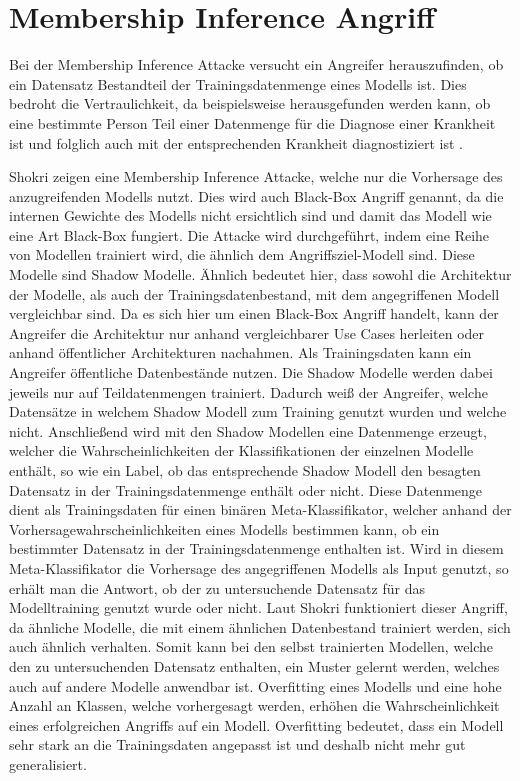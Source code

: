 \section{Membership Inference Angriff}\label{sec:membership_inference}

Bei der Membership Inference Attacke versucht ein Angreifer herauszufinden, ob ein Datensatz Bestandteil der Trainingsdatenmenge eines Modells ist. 
Dies bedroht die Vertraulichkeit, da beispielsweise herausgefunden werden kann, ob eine bestimmte Person Teil einer Datenmenge für die Diagnose einer Krankheit ist und folglich auch mit der entsprechenden Krankheit diagnostiziert ist \cite{P-2}.

Shokri \etal \cite{P-2} zeigen eine Membership Inference Attacke, welche nur die Vorhersage des anzugreifenden Modells nutzt. 
Dies wird auch Black-Box Angriff genannt, da die internen Gewichte des Modells nicht ersichtlich sind und damit das Modell wie eine Art Black-Box fungiert.
Die Attacke wird durchgeführt, indem eine Reihe von Modellen trainiert wird, die ähnlich dem Angriffsziel-Modell sind.
Diese Modelle sind Shadow Modelle.
Ähnlich bedeutet hier, dass sowohl die Architektur der Modelle, als auch der Trainingsdatenbestand, mit dem angegriffenen Modell vergleichbar sind.
Da es sich hier um einen Black-Box Angriff handelt, kann der Angreifer die Architektur nur anhand vergleichbarer Use Cases herleiten oder anhand öffentlicher Architekturen nachahmen. 
Als Trainingsdaten kann ein Angreifer öffentliche Datenbestände nutzen.
Die Shadow Modelle werden dabei jeweils nur auf Teildatenmengen trainiert. 
Dadurch weiß der Angreifer, welche Datensätze in welchem Shadow Modell zum Training genutzt wurden und welche nicht.
Anschließend wird mit den Shadow Modellen eine Datenmenge erzeugt, welcher die Wahrscheinlichkeiten der Klassifikationen der einzelnen Modelle enthält, so wie ein Label, ob das entsprechende Shadow Modell den besagten Datensatz in der Trainingsdatenmenge enthält oder nicht. 
Diese Datenmenge dient als Trainingsdaten für einen binären Meta-Klassifikator, welcher anhand der Vorhersagewahrscheinlichkeiten eines Modells bestimmen kann, ob ein bestimmter Datensatz in der Trainingsdatenmenge enthalten ist.
Wird in diesem Meta-Klassifikator die Vorhersage des angegriffenen Modells als Input genutzt, so erhält man die Antwort, ob der zu untersuchende Datensatz für das Modelltraining genutzt wurde oder nicht.
Laut Shokri \etal \cite{P-2} funktioniert dieser Angriff, da ähnliche Modelle, die mit einem ähnlichen Datenbestand trainiert werden, sich auch ähnlich verhalten. 
Somit kann bei den selbst trainierten Modellen, welche den zu untersuchenden Datensatz enthalten, ein Muster gelernt werden, welches auch auf andere Modelle anwendbar ist. 
Overfitting eines Modells und eine hohe Anzahl an Klassen, welche vorhergesagt werden, erhöhen die Wahrscheinlichkeit eines erfolgreichen Angriffs auf ein Modell.
Overfitting bedeutet, dass ein Modell sehr stark an die Trainingsdaten angepasst ist und deshalb nicht mehr gut generalisiert.


